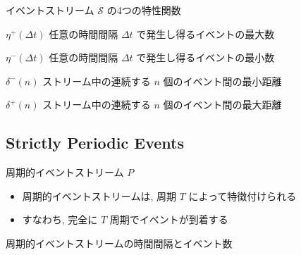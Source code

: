 \begin{frame}{イベントストリーム $\mathcal{S}$ の4つの特性関数}
    \begin{block}{$\eta^{+}(\Delta t)$}
        任意の時間間隔 $\Delta t$ で発生し得るイベントの最大数
    \end{block}
    \begin{block}{$\eta^{-}(\Delta t)$}
        任意の時間間隔 $\Delta t$ で発生し得るイベントの最小数
    \end{block}
    \begin{block}{$\delta^{-}(n)$}
        ストリーム中の連続する $n$ 個のイベント間の最小距離
    \end{block}
    \begin{block}{$\delta^{+}(n)$}
        ストリーム中の連続する $n$ 個のイベント間の最大距離
    \end{block}
\end{frame}


\subsection{Strictly Periodic Events}
\label{ssec: strictly periodic events}

\begin{frame}{周期的イベントストリーム $P$}
    \begin{itemize}
        \item 周期的イベントストリームは, 周期 $T$ によって特徴付けられる
        \item すなわち, 完全に $T$ 周期でイベントが到着する
    \end{itemize}
\end{frame}

\begin{frame}{周期的イベントストリームの時間間隔とイベント数}
\end{frame}



